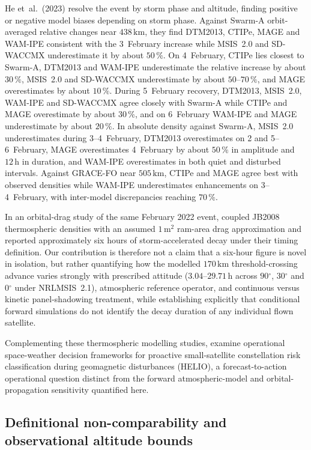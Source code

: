 \documentclass[12pt]{article}
\newcommand{\unit}[1]{\,\mathrm{#1}}
\newcommand{\degree}{\ensuremath{{}^\circ}}
\begin{document}
He et~al.\ (2023) resolve the event by storm phase and altitude, finding positive or negative model biases depending on storm phase. Against Swarm-A orbit-averaged relative changes near $438\unit{km}$, they find DTM2013, CTIPe, MAGE and WAM-IPE consistent with the 3~February increase while MSIS~2.0 and SD-WACCMX underestimate it by about $50\,\%$. On 4~February, CTIPe lies closest to Swarm-A, DTM2013 and WAM-IPE underestimate the relative increase by about $30\,\%$, MSIS~2.0 and SD-WACCMX underestimate by about $50$--$70\,\%$, and MAGE overestimates by about $10\,\%$. During 5~February recovery, DTM2013, MSIS~2.0, WAM-IPE and SD-WACCMX agree closely with Swarm-A while CTIPe and MAGE overestimate by about $30\,\%$, and on 6~February WAM-IPE and MAGE underestimate by about $20\,\%$. In absolute density against Swarm-A, MSIS~2.0 underestimates during 3--4~February, DTM2013 overestimates on 2 and 5--6~February, MAGE overestimates 4~February by about $50\,\%$ in amplitude and $12\unit{h}$ in duration, and WAM-IPE overestimates in both quiet and disturbed intervals. Against GRACE-FO near $505\unit{km}$, CTIPe and MAGE agree best with observed densities while WAM-IPE underestimates enhancements on 3--4~February, with inter-model discrepancies reaching $70\,\%$.

In an orbital-drag study of the same February 2022 event, \citet{baruah2024} coupled JB2008 thermospheric densities with an assumed $1\unit{m^2}$ ram-area drag approximation and reported approximately six hours of storm-accelerated decay under their timing definition. Our contribution is therefore not a claim that a six-hour figure is novel in isolation, but rather quantifying how the modelled $170\unit{km}$ threshold-crossing advance varies strongly with prescribed attitude ($3.04$--$29.71\unit{h}$ across $90\degree$, $30\degree$ and $0\degree$ under NRLMSIS~2.1), atmospheric reference operator, and continuous versus kinetic panel-shadowing treatment, while establishing explicitly that conditional forward simulations do not identify the decay duration of any individual flown satellite.

Complementing these thermospheric modelling studies, \citet{nager2026} examine operational space-weather decision frameworks for proactive small-satellite constellation risk classification during geomagnetic disturbances (HELIO), a forecast-to-action operational question distinct from the forward atmospheric-model and orbital-propagation sensitivity quantified here.

\subsection{Definitional non-comparability and observational altitude bounds}
\label{sec:nolitcompare}
\end{document}
